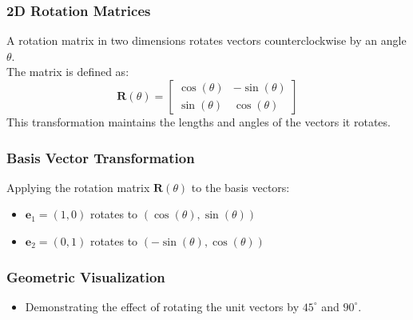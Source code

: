 \documentclass[aspectratio=169]{beamer}
\begin{document}
\begin{frame}
\frametitle{2D Rotation Matrices}
A rotation matrix in two dimensions rotates vectors counterclockwise by an angle \( \theta \).\\[1cm]
\pause The matrix is defined as: 
\[
\mathbf{R}(\theta) = \begin{bmatrix}
\cos(\theta) & -\sin(\theta) \\
\sin(\theta) & \cos(\theta)
\end{bmatrix}
\]
This transformation maintains the lengths and angles of the vectors it rotates.
\end{frame}

\begin{frame}
\frametitle{Basis Vector Transformation}
Applying the rotation matrix \( \mathbf{R}(\theta) \) to the basis vectors:
\begin{itemize}
    \item<2-> \( \mathbf{e}_1 = (1, 0) \) rotates to \( (\cos(\theta), \sin(\theta)) \)
    \item<3-> \( \mathbf{e}_2 = (0, 1) \) rotates to \( (-\sin(\theta), \cos(\theta)) \)
\end{itemize}
\end{frame}

\begin{frame}
\frametitle{Geometric Visualization}
\begin{itemize}
    \item Demonstrating the effect of rotating the unit vectors by \( 45^\circ \) and \( 90^\circ \).
\end{itemize}
\begin{center}
\end{center}
\end{frame}
\end{document}
